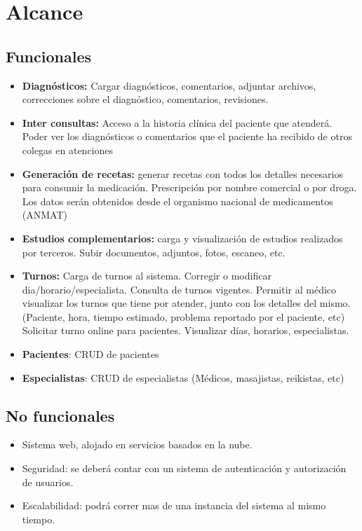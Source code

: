 \documentclass[a4paper, 10pt, oneside]{book}
\begin{document}
    \section{Alcance}\label{sec:alcance}
    \subsection{Funcionales}\label{subsec:funcionales}
    \begin{itemize}
        \item \textbf{Diagnósticos:} Cargar diagnósticos, comentarios, adjuntar archivos, correcciones sobre el diagnóstico, comentarios, revisiones.
        \item \textbf{Inter consultas:} Acceso a la historia clínica del paciente que atenderá.
        Poder ver los diagnósticos o comentarios que el paciente ha recibido de otros colegas en atenciones
        \item \textbf{Generación de recetas:} generar recetas con todos los detalles necesarios para consumir la medicación.
        Prescripción por nombre comercial o por droga. Los datos serán obtenidos desde el organismo nacional de medicamentos (ANMAT)
        \item \textbf{Estudios complementarios:} carga y visualización de estudios realizados por terceros.
        Subir documentos, adjuntos, fotos, escaneo, etc.
        \item \textbf{Turnos:}
        \subitem Carga de turnos al sistema.
        Corregir o modificar dia/horario/especialista.
        Consulta de turnos vigentes.
        \subitem Permitir al médico visualizar los turnos que tiene por atender, junto con los detalles del mismo. (Paciente, hora, tiempo estimado, problema reportado por el paciente, etc)
        \subitem Solicitar turno online para pacientes.
        Visualizar días, horarios, especialistas.
        \item \textbf{Pacientes}: CRUD de pacientes
        \item \textbf{Especialistas}: CRUD de especialistas (Médicos, masajistas, reikistas, etc)
    \end{itemize}

    \subsection{No funcionales}\label{subsec:noFuncionales}
    \begin{itemize}
        \item Sistema web, alojado en servicios basados en la nube.
        \item Seguridad: se deberá contar con un sistema de autenticación y autorización de usuarios.
        \item Escalabilidad: podrá correr mas de una instancia del sistema al mismo tiempo.
    \end{itemize}
\end{document}
